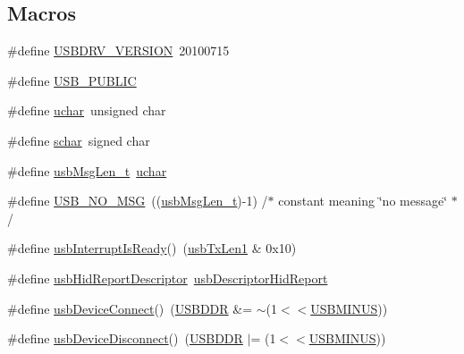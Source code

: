 \subsection*{Macros}
\begin{DoxyCompactItemize}
\item 
\#define \hyperlink{mhvlib-_vusb-_console_2vusb_2usbdrv_8h_a938381382a94d1c945b7233fcfa78e0e}{U\-S\-B\-D\-R\-V\-\_\-\-V\-E\-R\-S\-I\-O\-N}~20100715
\item 
\#define \hyperlink{mhvlib-_vusb-_console_2vusb_2usbdrv_8h_a5f6aa87267678dc37dd5d97a7b3df7c3}{U\-S\-B\-\_\-\-P\-U\-B\-L\-I\-C}
\item 
\#define \hyperlink{mhvlib-_vusb-_console_2vusb_2usbdrv_8h_aa8ddf20cdd716b652e76e23e5e700893}{uchar}~unsigned char
\item 
\#define \hyperlink{mhvlib-_vusb-_console_2vusb_2usbdrv_8h_af2cbb84f982ea77dfbb738af3a027591}{schar}~signed char
\item 
\#define \hyperlink{mhvlib-_vusb-_console_2vusb_2usbdrv_8h_a57df3bf9fc8ec8cd9b29ba8dfc361059}{usb\-Msg\-Len\-\_\-t}~\hyperlink{mhvlib-_vusb-_console_2vusb_2usbdrv_8h_aa8ddf20cdd716b652e76e23e5e700893}{uchar}
\item 
\#define \hyperlink{mhvlib-_vusb-_console_2vusb_2usbdrv_8h_a0bf378ff9540265128eef4f085176dcc}{U\-S\-B\-\_\-\-N\-O\-\_\-\-M\-S\-G}~((\hyperlink{mhvlib-_vusb-_console_2vusb_2usbdrv_8h_a57df3bf9fc8ec8cd9b29ba8dfc361059}{usb\-Msg\-Len\-\_\-t})-\/1)   /$\ast$ constant meaning \char`\"{}no message\char`\"{} $\ast$/
\item 
\#define \hyperlink{mhvlib-_vusb-_console_2vusb_2usbdrv_8h_a1f6b221fb650a7575d4937e37956181d}{usb\-Interrupt\-Is\-Ready}()~(\hyperlink{mhvlib-_vusb-_console_2vusb_2usbdrv_8h_aac21ed24e5889d02bdecaefb2881dca9}{usb\-Tx\-Len1} \& 0x10)
\item 
\#define \hyperlink{mhvlib-_vusb-_console_2vusb_2usbdrv_8h_a37718d9af25fd62f30b25e057468e39b}{usb\-Hid\-Report\-Descriptor}~\hyperlink{mhvlib-_vusb-_console_2vusb_2usbdrv_8h_a66e1ec15fd4a4458927902d3764179af}{usb\-Descriptor\-Hid\-Report}
\item 
\#define \hyperlink{mhvlib-_vusb-_console_2vusb_2usbdrv_8h_a475d8622b0e0b64b65312970940c600e}{usb\-Device\-Connect}()~(\hyperlink{mhvlib-_vusb-_console_2vusb_2usbdrv_8h_a3ffc8a49ee40206cfce717574a1ccfea}{U\-S\-B\-D\-D\-R} \&= $\sim$(1$<$$<$\hyperlink{mhvlib-_vusb-_console_2vusb_2usbdrv_8h_ad84a1c137f273772bcba266e0a671d33}{U\-S\-B\-M\-I\-N\-U\-S}))
\item 
\#define \hyperlink{mhvlib-_vusb-_console_2vusb_2usbdrv_8h_a82287e0a9f6403a674aae635f4c9ce37}{usb\-Device\-Disconnect}()~(\hyperlink{mhvlib-_vusb-_console_2vusb_2usbdrv_8h_a3ffc8a49ee40206cfce717574a1ccfea}{U\-S\-B\-D\-D\-R} $|$= (1$<$$<$\hyperlink{mhvlib-_vusb-_console_2vusb_2usbdrv_8h_ad84a1c137f273772bcba266e0a671d33}{U\-S\-B\-M\-I\-N\-U\-S}))

\end{DoxyCompactItemize}

